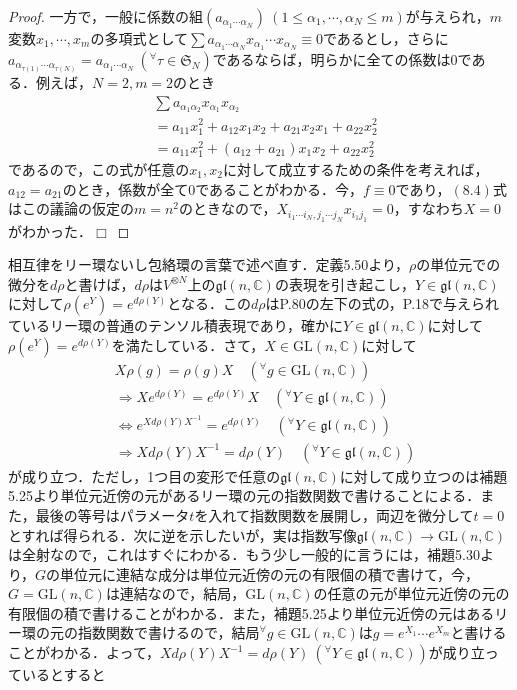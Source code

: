 \documentclass[dvipdfmx]{jsarticle}
\newtheorem{proof}{証明}
\def\qed{\hfill $\Box$}
\begin{document}
\begin{proof}
一方で，一般に係数の組$(a_{\alpha_1\cdots\alpha_N}){\ }(1\leq\alpha_1,\cdots,\alpha_N\leq m)$が与えられ，$m$変数$x_1,\cdots,x_m$の多項式として$\sum a_{\alpha_1\cdots\alpha_N}x_{\alpha_1}\cdots x_{\alpha_N}\equiv 0$であるとし，さらに$a_{\alpha_{\tau(1)}\cdots\alpha_{\tau(N)}}=a_{\alpha_1\cdots\alpha_N}{\ }( ^\forall \tau\in\mathfrak{S}_N)$であるならば，明らかに全ての係数は0である．例えば，$N=2,m=2$のとき
\begin{align*}
&\sum a_{\alpha_1\alpha_2}x_{\alpha_1}x_{\alpha_2} \\
&=a_{11}x_1^2+a_{12}x_1x_2+a_{21}x_2x_1+a_{22}x_2^2 \\
&=a_{11}x_1^2+(a_{12}+a_{21})x_1x_2+a_{22}x_2^2
\end{align*}
であるので，この式が任意の$x_1,x_2$に対して成立するための条件を考えれば，$a_{12}=a_{21}$のとき，係数が全て$0$であることがわかる．今，$f\equiv 0$であり，$(8.4)$式はこの議論の仮定の$m=n^2$のときなので，$X_{i_1\cdots i_N,j_1\cdots j_N}x_{i_1j_1}=0$，すなわち$X=0$がわかった．\qed
\end{proof}
%
%
%
%
%
相互律をリー環ないし包絡環の言葉で述べ直す．\cite{kobayashi}定義5.50より，$\rho$の単位元での微分を$d\rho$と書けば，$d\rho$は$V^{\otimes N}$上の$\mathfrak{gl}(n,\mathbb{C})$の表現を引き起こし，$Y\in\mathfrak{gl}(n,\mathbb{C})$に対して$\rho(e^{Y})=e^{d\rho(Y)}$となる．この$d\rho$はP.80の左下の式の，P.18で与えられているリー環の普通のテンソル積表現であり，確かに$Y\in\mathfrak{gl}(n,\mathbb{C})$に対して$\rho(e^{Y})=e^{d\rho(Y)}$を満たしている．さて，$X\in\mathrm{GL}(n,\mathbb{C})$に対して
\begin{align*}
&X\rho(g)=\rho(g)X \quad ( ^\forall g\in \mathrm{GL}(n,\mathbb{C})) \\
&\Longrightarrow Xe^{d\rho(Y)}=e^{d\rho(Y)}X \quad ( ^\forall Y\in \mathfrak{gl}(n,\mathbb{C})) \\
&\Longleftrightarrow e^{Xd\rho(Y)X^{-1}}=e^{d\rho(Y)} \quad ( ^\forall Y\in \mathfrak{gl}(n,\mathbb{C})) \\
&\Longrightarrow Xd\rho(Y)X^{-1}=d\rho(Y) \quad ( ^\forall Y\in \mathfrak{gl}(n,\mathbb{C}))
\end{align*}
が成り立つ．ただし，1つ目の変形で任意の$\mathfrak{gl}(n,\mathbb{C})$に対して成り立つのは\cite{kobayashi}補題5.25より単位元近傍の元があるリー環の元の指数関数で書けることによる．また，最後の等号はパラメータ$t$を入れて指数関数を展開し，両辺を微分して$t=0$とすれば得られる．次に逆を示したいが，実は指数写像$\mathfrak{gl}(n,\mathbb{C})\to \mathrm{GL}(n,\mathbb{C})$は全射なので，これはすぐにわかる．もう少し一般的に言うには，\cite{kobayashi}補題5.30より，$G$の単位元に連結な成分は単位元近傍の元の有限個の積で書けて，今，$G=\mathrm{GL}(n,\mathbb{C})$は連結なので，結局，$\mathrm{GL}(n,\mathbb{C})$の任意の元が単位元近傍の元の有限個の積で書けることがわかる．また，\cite{kobayashi}補題5.25より単位元近傍の元はあるリー環の元の指数関数で書けるので，結局$^\forall g\in\mathrm{GL}(n,\mathbb{C})$は$g=e^{X_1}\cdots e^{X_m}$と書けることがわかる．よって，$Xd\rho(Y)X^{-1}=d\rho(Y){\ }( ^\forall Y\in \mathfrak{gl}(n,\mathbb{C}))$が成り立っているとすると
\end{document}
